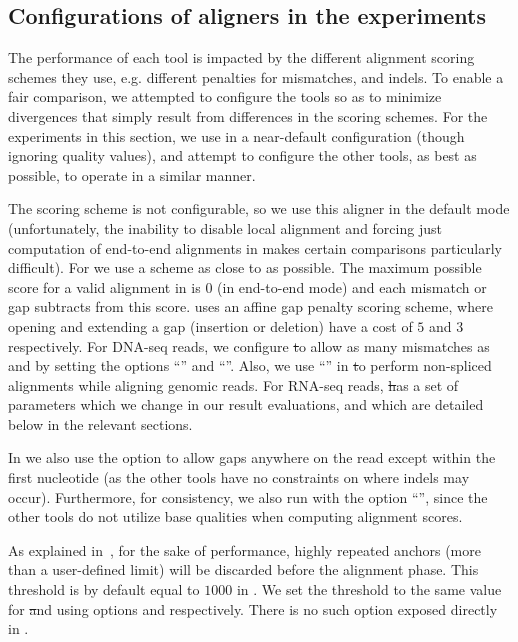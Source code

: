 \subsection{Configurations of aligners in the experiments}

The performance of each tool is impacted by the different alignment scoring schemes they use, e.g. 
different penalties for mismatches, and indels. To enable a fair comparison, we attempted to configure 
the tools so as to minimize divergences that simply result from differences in the scoring schemes. For 
the experiments in this section, we use \bt in a near-default configuration (though ignoring quality values), 
and attempt to configure the other tools, as best as possible, to operate in a similar manner.

The \debga scoring scheme is not configurable, so we use this aligner in the default mode (unfortunately, 
the inability to disable local alignment and forcing just computation of end-to-end alignments in \debga makes 
certain comparisons particularly difficult). For \puffaligner we use a scheme as close to \bt as possible. The 
maximum possible score for a valid alignment in \bt is $0$ (in end-to-end mode) and each mismatch or gap subtracts 
from this score. \bt uses an affine gap penalty scoring scheme, where opening and extending a gap (insertion or 
deletion) have a cost of $5$ and $3$ respectively. For DNA-seq reads, we configure \st to allow as many mismatches 
as \bt and \puffaligner by setting the options ``'' and 
``''. Also, we use ``'' in \st to perform 
non-spliced alignments while aligning genomic reads. For RNA-seq reads, \st has a set of parameters which 
we change in our result evaluations, and which are detailed below in the relevant sections.

In \bt we also use the option  to allow gaps anywhere on the read except within the first 
nucleotide (as the other tools have no constraints on where indels may occur). Furthermore, for consistency, 
we also run \bt with the option ``'', since the other tools do not utilize base qualities 
when computing alignment scores.

As explained in~, for the sake of performance, highly repeated anchors 
(more than a user-defined limit) will be discarded before the alignment phase.
This threshold is by default equal to $1000$ in \puffaligner. We set the threshold to the same 
value for \st and \debga using options  and  
respectively. There is no such option exposed directly in \bt.


